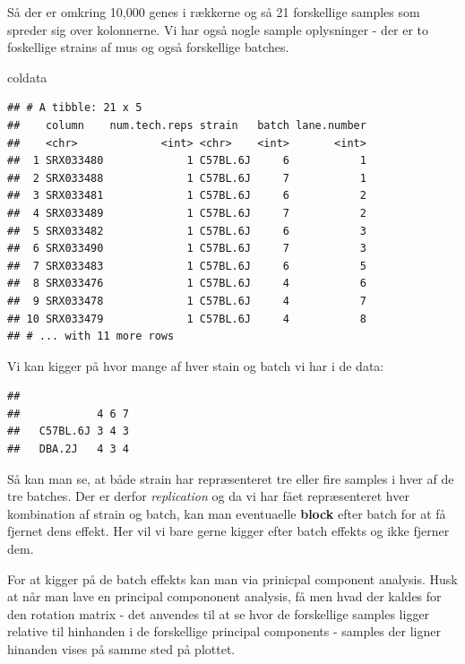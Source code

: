 \documentclass[
]{book}
\newenvironment{Shaded}{\begin{snugshade}}{\end{snugshade}}
\newcommand{\FunctionTok}[1]{\textcolor[rgb]{0.00,0.00,0.00}{#1}}
\newcommand{\NormalTok}[1]{#1}
\newcommand{\SpecialCharTok}[1]{\textcolor[rgb]{0.00,0.00,0.00}{#1}}
\begin{document}
Så der er omkring 10,000 genes i rækkerne og så 21 forskellige samples som spreder sig over kolonnerne. Vi har også nogle sample oplysninger - der er to foskellige strains af mus og også forskellige batches.

\begin{Shaded}
\begin{Highlighting}[]
\NormalTok{coldata}
\end{Highlighting}
\end{Shaded}

\begin{verbatim}
## # A tibble: 21 x 5
##    column    num.tech.reps strain   batch lane.number
##    <chr>             <int> <chr>    <int>       <int>
##  1 SRX033480             1 C57BL.6J     6           1
##  2 SRX033488             1 C57BL.6J     7           1
##  3 SRX033481             1 C57BL.6J     6           2
##  4 SRX033489             1 C57BL.6J     7           2
##  5 SRX033482             1 C57BL.6J     6           3
##  6 SRX033490             1 C57BL.6J     7           3
##  7 SRX033483             1 C57BL.6J     6           5
##  8 SRX033476             1 C57BL.6J     4           6
##  9 SRX033478             1 C57BL.6J     4           7
## 10 SRX033479             1 C57BL.6J     4           8
## # ... with 11 more rows
\end{verbatim}

Vi kan kigger på hvor mange af hver stain og batch vi har i de data:

\begin{Shaded}
\end{Shaded}

\begin{verbatim}
##           
##            4 6 7
##   C57BL.6J 3 4 3
##   DBA.2J   4 3 4
\end{verbatim}

Så kan man se, at både strain har repræsenteret tre eller fire samples i hver af de tre batches. Der er derfor \emph{replication} og da vi har fået repræsenteret hver kombination af strain og batch, kan man eventuaelle \textbf{block} efter batch for at få fjernet dens effekt. Her vil vi bare gerne kigger efter batch effekts og ikke fjerner dem.

For at kigger på de batch effekts kan man via prinicpal component analysis. Husk at når man lave en principal compononent analysis, få men hvad der kaldes for den rotation matrix - det anvendes til at se hvor de forskellige samples ligger relative til hinhanden i de forskellige principal components - samples der ligner hinanden vises på samme sted på plottet.
\end{document}
